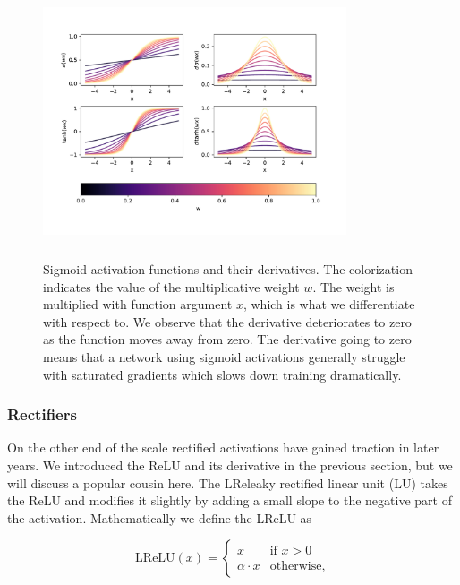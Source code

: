 \begin{figure}[ht]
\centering
\includegraphics[width=0.8\textwidth, height=8cm]{../figures/activationssigmoids.pdf}
\caption[Sigmoid activation functions]{Sigmoid activation functions and their derivatives. The colorization indicates the value of the multiplicative weight $w$. The weight is multiplied with function argument $x$, which is what we differentiate with respect to.  We observe that the derivative deteriorates to zero as the function moves away from zero. The derivative going to zero means that a network using sigmoid activations generally struggle with saturated gradients which slows down training dramatically.}\label{fig:sigmoid}
\end{figure}

\subsubsection{Rectifiers}

On the other end of the scale rectified activations have gained traction in later years. We introduced the ReLU and its derivative in the previous section, but we will discuss a popular cousin here. The LReleaky rectified linear unit (LU) takes the ReLU and modifies it slightly by adding a small slope to the negative part of the activation. Mathematically we define the LReLU as 

\begin{equation}\label{eq:lrelu}
    \text{LReLU} (x)  = \begin{cases}
    x & \text{if } x > 0 \\
    \alpha\cdot x  & \text{otherwise},
    \end{cases}
\end{equation}

